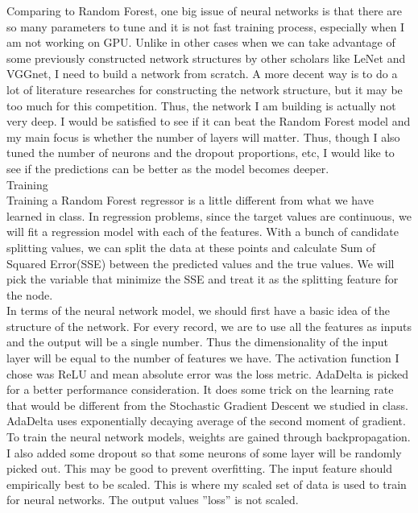 \documentclass{article}
\begin{document}
\noindent
Comparing to Random Forest, one big issue of neural networks is that there are so many parameters to tune and it is not fast training process, especially when I am not working on GPU. Unlike in other cases when we can take advantage of some previously constructed network structures by other scholars like LeNet and VGGnet, I need to build a network from scratch. A more decent way is to do a lot of literature researches for constructing the network structure, but it may be too much for this competition. Thus, the network I am building is actually not very deep. I would be satisfied to see if it can beat the Random Forest model and my main focus is whether the number of layers will matter. Thus, though I also tuned the number of neurons and the dropout proportions, etc, I would like to see if the predictions can be better as the model becomes deeper.\\ 

  Training\\

\noindent
Training a Random Forest regressor is a little different from what we have learned in class. In regression problems, since the target values are continuous, we will fit a regression model with each of the features. With a bunch of candidate splitting values, we can split the data at these points and calculate Sum of Squared Error(SSE) between the predicted values and the true values. We will pick the variable that minimize the SSE and treat it as the splitting feature for the node.\\

\noindent
In terms of the neural network model, we should first have a basic idea of the structure of the network. For every record, we are to use all the features as inputs and the output will be a single number. Thus the dimensionality of the input layer will be equal to the number of features we have. The activation function I chose was ReLU and mean absolute error was the loss metric. AdaDelta is picked for a better performance consideration. It does some trick on the learning rate that would be different from the Stochastic Gradient Descent we studied in class. AdaDelta uses exponentially decaying average of the second moment of gradient. To train the neural network models, weights are gained through backpropagation. I also added some dropout so that some neurons of some layer will be randomly picked out. This may be good to prevent overfitting. The input feature should empirically best to be scaled. This is where my scaled set of data is used to train for neural networks. The output values ''loss'' is not scaled.\\
\end{document}
